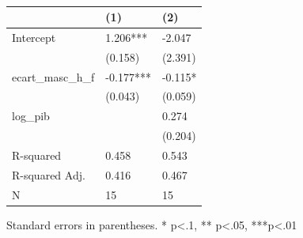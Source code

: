 \begin{table}
\caption{}
\label{}
\begin{center}
\begin{tabular}{lll}
\hline
                  & (1)       & (2)      \\
\hline
Intercept         & 1.206***  & -2.047   \\
                  & (0.158)   & (2.391)  \\
ecart\_masc\_h\_f & -0.177*** & -0.115*  \\
                  & (0.043)   & (0.059)  \\
log\_pib          &           & 0.274    \\
                  &           & (0.204)  \\
R-squared         & 0.458     & 0.543    \\
R-squared Adj.    & 0.416     & 0.467    \\
N                 & 15        & 15       \\
\hline
\end{tabular}
\end{center}
\end{table}
\bigskip
Standard errors in parentheses. \newline 
* p<.1, ** p<.05, ***p<.01